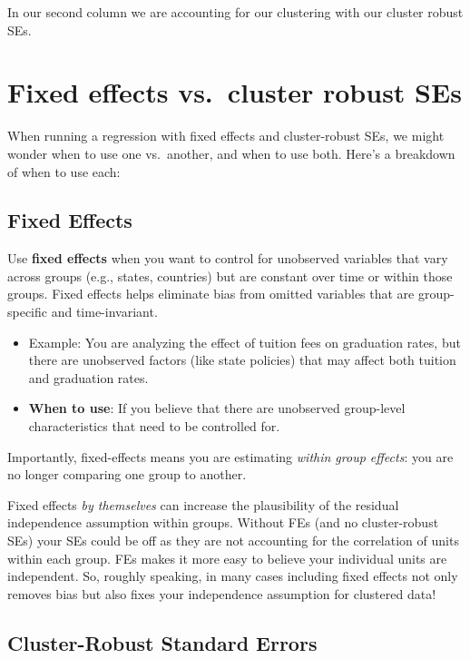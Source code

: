 \documentclass[
  letterpaper,
  DIV=11,
  numbers=noendperiod]{scrreprt}
\providecommand{\tightlist}{%
  \setlength{\itemsep}{0pt}\setlength{\parskip}{0pt}}\usepackage{longtable,booktabs,array}
\begin{document}
In our second column we are accounting for our clustering with our
cluster robust SEs.

\section{Fixed effects vs.~cluster robust
SEs}\label{fixed-effects-vs.-cluster-robust-ses}

When running a regression with fixed effects and cluster-robust SEs, we
might wonder when to use one vs.~another, and when to use both. Here's a
breakdown of when to use each:

\subsection{Fixed Effects}\label{fixed-effects-1}

Use \textbf{fixed effects} when you want to control for unobserved
variables that vary across groups (e.g., states, countries) but are
constant over time or within those groups. Fixed effects helps eliminate
bias from omitted variables that are group-specific and time-invariant.

\begin{itemize}
\tightlist
\item
  Example: You are analyzing the effect of tuition fees on graduation
  rates, but there are unobserved factors (like state policies) that may
  affect both tuition and graduation rates.
\item
  \textbf{When to use}: If you believe that there are unobserved
  group-level characteristics that need to be controlled for.
\end{itemize}

Importantly, fixed-effects means you are estimating \emph{within group
effects}: you are no longer comparing one group to another.

Fixed effects \emph{by themselves} can increase the plausibility of the
residual independence assumption within groups. Without FEs (and no
cluster-robust SEs) your SEs could be off as they are not accounting for
the correlation of units within each group. FEs makes it more easy to
believe your individual units are independent. So, roughly speaking, in
many cases including fixed effects not only removes bias but also fixes
your independence assumption for clustered data!

\subsection{Cluster-Robust Standard
Errors}\label{cluster-robust-standard-errors-1}
\end{document}
